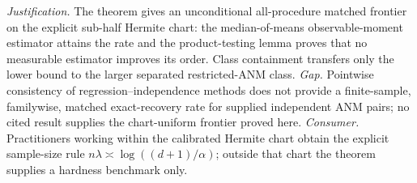 \documentclass{article}
\begin{document}
\par\smallskip\noindent \textit{Justification.} The theorem gives an unconditional all-procedure matched frontier on the explicit sub-half Hermite chart: the median-of-means observable-moment estimator attains the rate and the product-testing lemma proves that no measurable estimator improves its order. Class containment transfers only the lower bound to the larger separated restricted-ANM class. \textit{Gap.} Pointwise consistency of regression--independence methods does not provide a finite-sample, familywise, matched exact-recovery rate for supplied independent ANM pairs; no cited result supplies the chart-uniform frontier proved here. \textit{Consumer.} Practitioners working within the calibrated Hermite chart obtain the explicit sample-size rule \(n\lambda\asymp\log((d+1)/\alpha)\); outside that chart the theorem supplies a hardness benchmark only.
\end{document}
